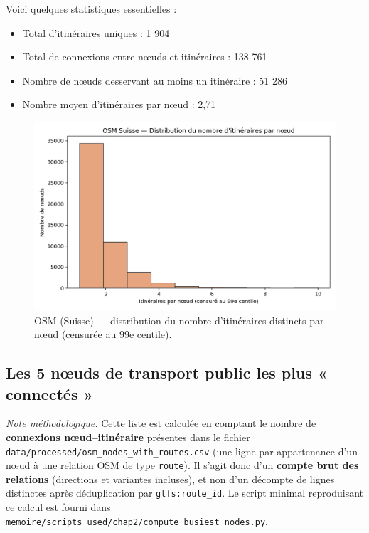Voici quelques statistiques essentielles :

\begin{itemize}
    \item Total d'itinéraires uniques : 1 904  
    \item Total de connexions entre nœuds et itinéraires : 138 761  
    \item Nombre de nœuds desservant au moins un itinéraire : 51 286  
    \item Nombre moyen d'itinéraires par nœud : 2,71  
\end{itemize}

\begin{figure}[H]
  \centering
  \includegraphics[width=.8\linewidth]{figures/plots/osm_routes_per_node_hist.png}
  \caption[Distribution des itinéraires par nœud]{OSM (Suisse) — distribution du nombre d'itinéraires distincts par nœud (censurée au 99e centile).}
  \label{fig:osm_routes_per_node_hist}
\end{figure}



\subsection{Les 5 nœuds de transport public les plus « connectés »}

\noindent\textit{Note méthodologique.} Cette liste est calculée en comptant le nombre de \textbf{connexions nœud–itinéraire} présentes dans le fichier \texttt{data/processed/osm\_nodes\_with\_routes.csv} (une ligne par appartenance d’un nœud à une relation OSM de type \texttt{route}). Il s’agit donc d’un \textbf{compte brut des relations} (directions et variantes incluses), et non d’un décompte de lignes distinctes après déduplication par \texttt{gtfs:route\_id}. Le script minimal reproduisant ce calcul est fourni dans \texttt{memoire/scripts\_used/chap2/compute\_busiest\_nodes.py}.

